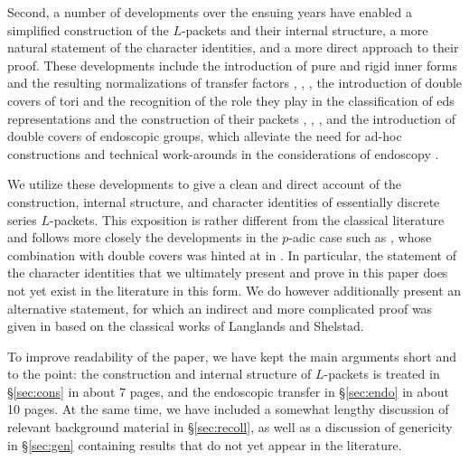 \documentclass{article}
\theoremstyle{definition}
\numberwithin{equation}{section}
\renewcommand{\-}{\hyp{}}
\begin{document}
Second, a number of developments over the ensuing years have enabled a simplified construction of the $L$\-packets and their internal structure, a more natural statement of the character identities, and a more direct approach to their proof. These developments include the introduction of pure and rigid inner forms and the resulting normalizations of transfer factors \cite{Vog93}, \cite{KalECI}, \cite{KalRI}, the introduction of double covers of tori and the recognition of the role they play in the classification of eds representations and the construction of their packets \cite{AV92}, \cite{AV16}, \cite{KalDC}, and the introduction of double covers of endoscopic groups, which alleviate the need for ad-hoc constructions and technical work-arounds in the considerations of endoscopy \cite{KalHDC}. 

We utilize these developments to give a clean and direct account of the construction, internal structure, and character identities of essentially discrete series $L$\-packets. This exposition is rather different from the classical literature and follows more closely the developments in the $p$-adic case such as \cite{KalRSP}, whose combination with double covers was hinted at in \cite{KalDC}. In particular, the statement of the character identities that we ultimately present and prove in this paper does not yet exist in the literature in this form. We do however additionally present an alternative statement, for which an indirect and more complicated proof was given in \cite{KalRI} based on the classical works of Langlands and Shelstad.

To improve readability of the paper, we have kept the main arguments short and to the point: the construction and internal structure of $L$-packets is treated in \S\ref{sec:cons} in about 7 pages, and the endoscopic transfer in \S\ref{sec:endo} in about 10 pages. At the same time, we have included a somewhat lengthy discussion of relevant background material in \S\ref{sec:recoll}, as well as a discussion of genericity in \S\ref{sec:gen} containing results that do not yet appear in the literature.
\end{document}
